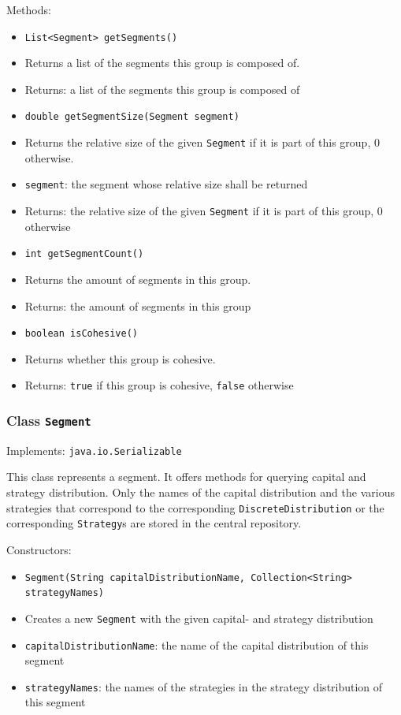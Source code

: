\documentclass[parskip=full,11pt]{scrartcl}
\begin{document}
Methods:
\begin{itemize}\itemsep -10pt
\item \texttt{List<Segment> getSegments()}
\item[] Returns a list of the segments this group is composed of.
\item[] Returns: a list of the segments this group is composed of

\item \texttt{double getSegmentSize(Segment segment)}
\item[] Returns the relative size of the given \texttt{Segment} if it is part of this group, \(0\) otherwise.
\item[] \texttt{segment}: the segment whose relative size shall be returned
\item[] Returns: the relative size of the given \texttt{Segment} if it is part of this group, \(0\) otherwise

\item \texttt{int getSegmentCount()}
\item[] Returns the amount of segments in this group.
\item[] Returns: the amount of segments in this group

\item \texttt{boolean isCohesive()}
\item[] Returns whether this group is cohesive.
\item[] Returns: \texttt{true} if this group is cohesive, \texttt{false} otherwise
\end{itemize}

\subsubsection{Class \texttt{Segment}}
Implements: \texttt{java.io.Serializable}

This class represents a segment. It offers methods for querying capital and strategy distribution. Only the names of the capital distribution and the various strategies that correspond to the corresponding \texttt{DiscreteDistribution} or the corresponding \texttt{Strategy}s are stored in the central repository.

Constructors:
\begin{itemize}\itemsep -10pt
\item \texttt{Segment(String capitalDistributionName, Collection<String> strategyNames)}
\item[] Creates a new \texttt{Segment} with the given capital- and strategy distribution
\item[] \texttt{capitalDistributionName}: the name of the capital distribution of this segment
\item[] \texttt{strategyNames}: the names of the strategies in the strategy distribution of this segment
\end{itemize}
\end{document}
